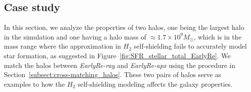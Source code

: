 \documentclass[linenumbers, twocolumn]{aastex631}
\begin{document}


\subsection{Case study}

In this section, we analyze the properties of two halos, one being the largest halo in the simulation and one having a halo mass of $\approx 1.7\times 10^{9} M_\odot$, which is in the mass range where the approximation in $H_{2}$ self-shielding fails to accurately model star formation, as suggested in Figure~\ref{fig:SFR_stellar_total_EarlyRe}. We match the halos between \textit{EarlyRe-ray} and \textit{EarlyRe-apx} using the procedure in Section~\ref{subsect:cross-matching_halos}. These two pairs of halos serve as examples to how the $H_{2}$ self-shielding modeling affects the galaxy properties. 
\end{document}
